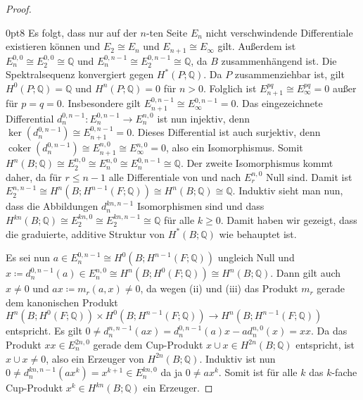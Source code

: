 \documentclass[11pt, a4paper, german]{article}
\theoremstyle{definition}
\theoremstyle{remark}
\newcommand{\Q}{\mathbb{Q}} %
\DeclareMathOperator{\coker}{coker} %
\begin{document}
\begin{proof}
\begin{cutout}{0}{\dimexpr\linewidth-8cm\relax}{0pt}{8}
    Es folgt, dass nur auf der $n$-ten Seite $E_n$ nicht verschwindende Differentiale existieren können und $E_2 \cong E_n$ und $E_{n+1} \cong E_\infty$ gilt.
    Außerdem ist $E_n^{0,0} \cong E_2^{0,0} \cong \Q$ und $E_n^{0,n-1} \cong E_2^{0,n-1} \cong \Q$, da $B$ zusammenhängend ist.
    Die Spektralsequenz konvergiert gegen $H^*(P; \Q)$.
    Da $P$ zusammenziehbar ist, gilt $H^0(P; \Q) = \Q$ und $H^n(P; \Q) = 0$ für $n > 0$.
    Folglich ist $E_{n+1}^{pq} \cong E_\infty^{pq} = 0$ außer für $p = q = 0$.
    Insbesondere gilt $E_{n+1}^{0,n-1} \cong E_\infty^{0,n-1} = 0$.
    Das eingezeichnete Differential $d_n^{0,n-1} : E_n^{0,n-1} \to E_n^{n,0}$ ist nun injektiv, denn $\ker(d_n^{0,n-1}) \cong E_{n+1}^{0,n-1} = 0$.
    Dieses Differential ist auch surjektiv, denn $\coker(d_n^{0,n-1}) \cong E_{n+1}^{n,0} \cong E_\infty^{n,0} = 0$, also ein Isomorphismus.
    Somit $H^n(B; \Q) \cong E_2^{n,0} \cong E_n^{n,0} \cong E_n^{0,n-1} \cong \Q$.
    Der zweite Isomorphismus kommt daher, da für $r \leq n-1$ alle Differentiale von und nach $E_r^{n,0}$ Null sind. %
    Damit ist $E_2^{n,n-1} \cong H^{n}(B; H^{n-1}(F; \Q)) \cong H^{n}(B; \Q) \cong \Q$.
    Induktiv sieht man nun, dass die Abbildungen $d_n^{kn,n-1}$ Isomorphismen sind und dass $H^{kn}(B; \Q) \cong E_2^{kn,0} \cong  E_2^{kn,n-1} \cong \Q$ für alle $k \geq 0$.
    Damit haben wir gezeigt, dass die graduierte, additive Struktur von $H^*(B; \Q)$ wie behauptet ist.
  \end{cutout}
  Es sei nun $a \in E_n^{0,n-1} \cong H^0(B; H^{n-1}(F; \Q))$ ungleich Null und $x \coloneqq d_n^{0,n-1}(a) \in E_n^{n,0} \cong H^n(B; H^0(F; \Q)) \cong H^n(B; \Q)$.
  Dann gilt auch $x \neq 0$ und $ax \coloneqq m_r(a, x) \neq 0$, da wegen (ii) und (iii) das Produkt $m_r$ gerade dem kanonischen Produkt $H^n(B; H^0(F; \Q)) \times H^0(B; H^{n-1}(F; \Q)) \to H^n(B; H^{n-1}(F; \Q))$ entspricht. %
  Es gilt
  $0 \neq d_n^{n,n-1}(ax) = d_n^{0,n-1}(a)x - a d_n^{n,0}(x) = xx$.
  Da das Produkt $xx \in E_n^{2n,0}$ gerade dem Cup-Produkt $x \cup x \in H^{2n}(B; \Q)$ entspricht, ist $x \cup x \neq 0$, also ein Erzeuger von $H^{2n}(B; \Q)$.
  Induktiv ist nun $0 \neq d_n^{kn,n-1}(a x^k) = x^{k+1} \in E_n^{kn,0}$ da ja $0 \neq a x^k$.
  Somit ist für alle $k$ das $k$-fache Cup-Produkt $x^k \in H^{kn}(B; \Q)$ ein Erzeuger.


\end{proof}
\end{document}
